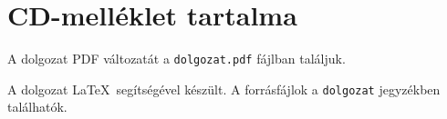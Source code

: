 \newpage
\section*{CD-melléklet tartalma}

A dolgozat PDF változatát a \texttt{dolgozat.pdf} fájlban találjuk.

A dolgozat \LaTeX\ segítségével készült. A forrásfájlok a \texttt{dolgozat} jegyzékben találhatók.



